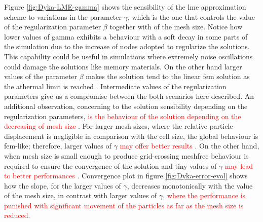\documentclass[preprint,12pt,a4paper]{elsarticle}
\newcommand{\PNA}[1]{
  \textcolor{red}{{#1}}
}
\begin{document}
Figure \eqref{fig:Dyka-LME-gamma} shows the sensibility of the \acrshort{lme}
approximation scheme to variations in the parameter
$\gamma$, which is the one that controls the value of the regularization parameter
$\beta$ together with of the mesh size. Notice how lower values of
gamma exhibits a behaviour with a soft decay in some parts of the
simulation due to the increase of nodes adopted to regularize the
solutions. This capability could be useful in simulations where
extremely noise oscillations could damage the solutions like memory
materials. On the other hand larger values of the parameter $\beta$
makes the solution tend to the linear \acrshort{fem} solution as the athermal limit is reached \cite{Arroyo2006}. Intermediate values of the
regularization parameters give us a compromise between the both
scenarios here described. An additional observation, concerning to the
solution sensibility depending on the regularization parameters, \PNA{is the behaviour of the solution depending on the decreasing of mesh
size}. For larger mesh sizes, where the relative particle displacement
is negligible in comparison with the cell size, the global behaviour
is \acrshort{fem}-like; therefore, larger values of $\gamma$ \PNA{may offer better results}. On the other hand, when mesh size is small enough to produce
grid-crossing meshfree behaviour is required to ensure the
convergence of the solution and tiny values of $\gamma$ \PNA{may lead to better
performances}. Convergence plot in figure \eqref{fig:Dyka-error-evol}
shows how the slope, for the larger values of $\gamma$, decreases
monotonically with the value of the mesh size, in contrast with larger
values of $\gamma$, \PNA{where the performance is punished with significant
movement of the particles as far as the mesh size is reduced.} 
\end{document}
